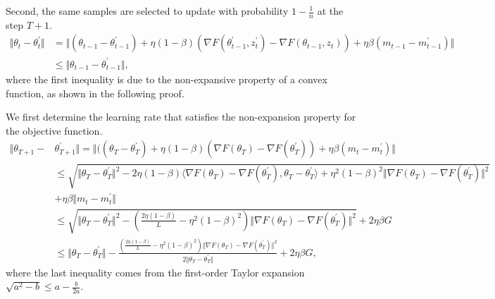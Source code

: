 Second, the same samples are selected to update with probability $1-\frac{1}{n}$ at the step $T+1$. 
 \begin{equation}
  \begin{aligned}
   \Vert \theta_t -\theta_t^{\prime} \Vert &= \Vert (\theta_{t-1} - \theta_{t-1}^{\prime}) + \eta (1-\beta)(\nabla F(\theta_{t-1}^{\prime},z_{t}^{\prime}) - \nabla F(\theta_{t-1},z_{t})) + \eta \beta(m_{t-1} - m_{t-1}^{\prime})\Vert\\
    &\leq \Vert\theta_{t-1} - \theta_{t-1}^{\prime}\Vert,
  \end{aligned}
 \end{equation}
where the first inequality is due to the non-expansive property of a convex function, as shown in the following proof.

We first determine the learning rate that satisfies the non-expansion property for the objective function.
\begin{equation}\label{eq:app2.3}
     \begin{aligned}
      \Vert \theta_{T+1} - &\theta_{T+1}^{\prime}\Vert = \Vert ((\theta_{T}-\theta_{T}^{\prime}) + \eta(1-\beta) (\nabla F(\theta_{T})-\nabla F(\theta_{T}^{\prime}))
      +\eta\beta(m_t-m_t^{\prime})\Vert  \\
      &\leq \sqrt{\Vert \theta_{T} - \theta_{T}^{\prime} \Vert^2 - 2\eta (1-\beta)\langle \nabla F(\theta_{T}) -\nabla F(\theta_{T}^{\prime}), \theta_T- \theta_T^{\prime} \rangle +\eta^2(1-\beta)^2 \Vert \nabla F(\theta_{T}) - \nabla F(\theta_{T}^{\prime})\Vert^2}\\& + \eta\beta\Vert m_t-m_t^{\prime}\Vert\\
      &\leq \sqrt{\Vert \theta_T- \theta_T^{\prime}\Vert^2 - \left(\frac{2\eta (1-\beta)}{L} -\eta^2(1-\beta)^2 \right) \Vert \nabla F(\theta_{T}) -\nabla F(\theta_{T}^{\prime})\Vert^2} + 2\eta\beta G \\
      &\leq \Vert \theta_T- \theta_T^{\prime}\Vert - \frac{\left(\frac{2\eta (1-\beta)}{L} -\eta^2(1-\beta)^2 \right) \Vert \nabla F(\theta_{T}) -\nabla F(\theta_{T}^{\prime})\Vert^2}{2\Vert \theta_T- \theta_T^{\prime}\Vert} + 2\eta\beta G,
     \end{aligned}
\end{equation}
where the last inequality comes from the first-order Taylor expansion $\sqrt{a^2-b}\leq a-\frac{b}{2a}$. 

